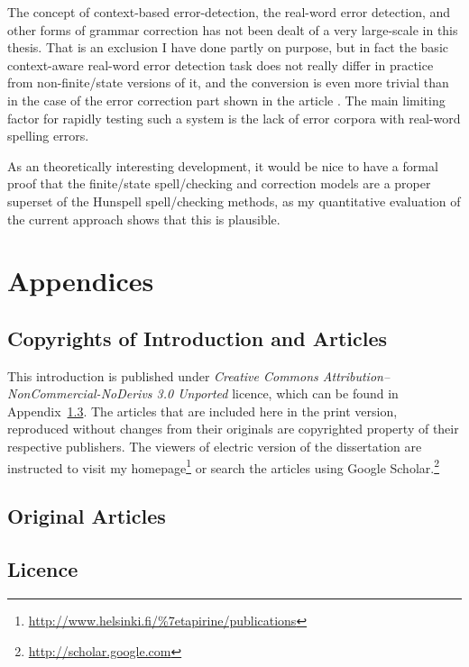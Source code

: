 \documentclass[officiallayout]{unihelcompling}
\begin{document}
The concept of context-based error-detection, the real-word error detection,
and other forms of grammar correction has not been dealt of a very large-scale
in this thesis. That is an exclusion I have done partly on purpose, but in fact
the basic context-aware real-word error detection task does not really differ
in practice from non-finite\-/state versions of it, and the conversion is even
more trivial than in the case of the error correction part shown in the article
. The main limiting factor for rapidly testing
such a system is the lack of error corpora with real-word spelling errors.

As an theoretically interesting development, it would be nice to have a formal
proof that the finite\-/state spell\-/checking and correction models are a proper
superset of the Hunspell spell\-/checking methods, as my quantitative
evaluation of the current approach shows that this is plausible.






\appendix
\chapter{Appendices}
\section{Copyrights of Introduction and Articles}
\label{appendix:copyrights}

This introduction is published under \emph{Creative Commons
Attribution–NonCommercial-NoDerivs 3.0 Unported} licence, which can be found in
Appendix~\ref{appendix:licence}. The articles that are included
here in the print version, reproduced without changes from their originals are
copyrighted property of their respective publishers. The viewers of electric
version of the dissertation are instructed to visit my
homepage\footnote{\url{http://www.helsinki.fi/\%7etapirine/publications}} or
        search the articles using Google
        Scholar.\footnote{\url{http://scholar.google.com}}

\iftrue
\section{Original Articles}
\label{appendix:articles}













\fi

\section{Licence}
\label{appendix:licence}


\end{document}

